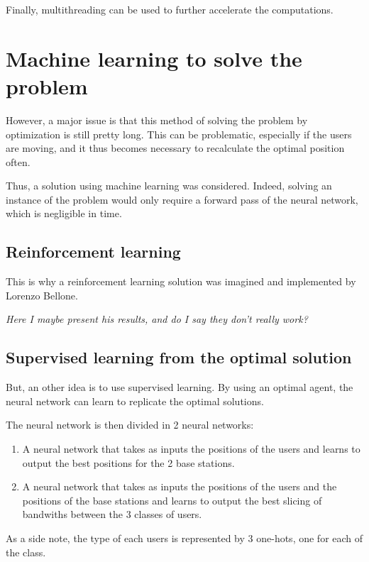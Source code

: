 \documentclass[letterpaper]{article}
\begin{document}
\begin{multicols}{2}
Finally, multithreading can be used to further accelerate the computations.

\section{Machine learning to solve the problem}

However, a major issue is that this method of solving the problem by optimization is still pretty long.
This can be problematic, especially if the users are moving, and it thus becomes necessary to recalculate the optimal position often.

Thus, a solution using machine learning was considered.
Indeed, solving an instance of the problem would only require a forward pass of the neural network, which is negligible in time.

\subsection{Reinforcement learning}

This is why a reinforcement learning solution was imagined and implemented by Lorenzo Bellone.

\textit{Here I maybe present his results, and do I say they don't really work?}

\subsection{Supervised learning from the optimal solution}

But, an other idea is to use supervised learning.
By using an optimal agent, the neural network can learn to replicate the optimal solutions.

The neural network is then divided in 2 neural networks:

\begin{enumerate}
    \item A neural network that takes as inputs the positions of the users and learns to output the best positions for the 2 base stations.
    \item A neural network that takes as inputs the positions of the users and the positions of the base stations and learns to output the best slicing of bandwiths between the 3 classes of users.
\end{enumerate}

As a side note, the type of each users is represented by 3 one-hots, one for each of the class.


\end{multicols}
\end{document}
